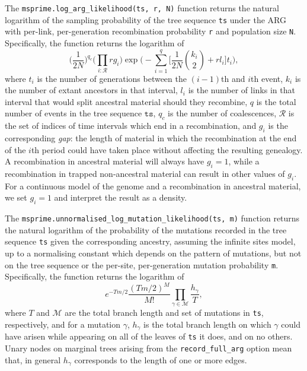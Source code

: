 \documentclass{article}
\begin{document}
The \texttt{msprime.log\_arg\_likelihood(ts, r, N)} function
returns the natural logarithm of
the sampling probability of the tree sequence \texttt{ts} under the ARG with per-link,
per-generation recombination probability \texttt{r} and population size \texttt{N}.
Specifically, the function returns the logarithm of
\begin{equation*}
\Bigg( \frac{ 1 }{ 2 N } \Bigg)^{ q_c } \Bigg( \prod_{ i : \mathcal{R} } r g_i \Bigg)
	\exp\Bigg( -\sum_{ i = 1 }^q \Big[\frac{ 1 }{ 2 N } \binom{ k_i }{ 2 }
		+ r l_i \Big] t_i  \Bigg),
\end{equation*}
where $t_i$ is the number of generations between the $(i - 1)$th and $i$th event,
$k_i$ is the number of extant ancestors in that interval, $l_i$ is the number of links
in that interval that would split ancestral material should they recombine,
$q$ is the total number of events in the tree sequence $\texttt{ts}$,
$q_c$ is the number of coalescences, $\mathcal{R}$ is the set of indices
of time intervals which end in a recombination, and $g_i$ is the corresponding
\emph{gap}:  the length of material in which the recombination at the end of the
$i$th period could have taken place without affecting the resulting genealogy.
A recombination in ancestral material will always have $g_i = 1$, while a recombination
in trapped non-ancestral material can result in other values of $g_i$.
For a continuous model of the genome and a recombination in ancestral material,
we set $g_i = 1$ and interpret the result as a density.

The \texttt{msprime.unnormalised\_log\_mutation\_likelihood(ts, m)} function returns the
natural logarithm of the probability of the mutations recorded in the tree sequence
\texttt{ts} given the corresponding ancestry, assuming the infinite sites model, up to
a normalising constant which depends on the pattern of mutations,
but not on the tree sequence or the per-site, per-generation mutation
probability \texttt{m}.
Specifically, the function returns the logarithm of
\begin{equation*}
e^{ - T m / 2 } \frac{ ( T m / 2 )^M }{ M ! }
\prod_{ \gamma \in \mathcal{ M } } \frac{ h_{ \gamma } }{ T },
\end{equation*}
where $T$ and $\mathcal{M}$ are the total branch length and set of mutations
in \texttt{ts}, respectively, and for a mutation $\gamma$, $h_{ \gamma }$ is the
total branch length on which $\gamma$ could have arisen while appearing on all
of the leaves of \texttt{ts} it does, and on no others.
Unary nodes on marginal trees arising from the \texttt{record\_full\_arg} option
mean that, in general $h_{ \gamma }$ corresponds to the length of one or more
edges.
\end{document}
